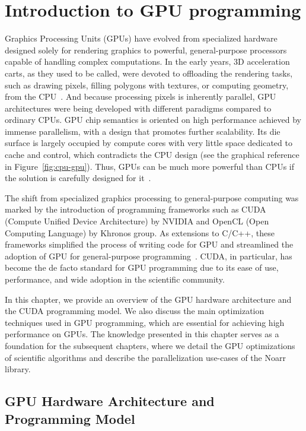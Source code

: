 \chapter{Introduction to GPU programming}
\label{chap:gpu_intro}


Graphics Processing Units (GPUs) have evolved from specialized hardware designed solely for rendering graphics to powerful, general-purpose processors capable of handling complex computations. In the early years, 3D acceleration carts, as they used to be called, were devoted to offloading the rendering tasks, such as drawing pixels, filling polygons with textures, or computing geometry, from the CPU~\cite{pratx2011gpu}. And because processing pixels is inherently parallel, GPU architectures were being developed with different paradigms compared to ordinary CPUs. GPU chip semantics is oriented on high performance achieved by immense parallelism, with a design that promotes further scalability. Its die surface is largely occupied by compute cores with very little space dedicated to cache and control, which contradicts the CPU design (see the graphical reference in Figure~\ref{fig:cpu-gpu}). Thus, GPUs can be much more powerful than CPUs if the solution is carefully designed for it~\cite{navarro2014survey}.

The shift from specialized graphics processing to general-purpose computing was marked by the introduction of programming frameworks such as CUDA (Compute Unified Device Architecture) by NVIDIA and OpenCL (Open Computing Language) by Khronos group. As extensions to C/C++, these frameworks simplified the process of writing code for GPU and streamlined the adoption of GPU for general-purpose programming~\cite{croix2009introduction}. CUDA, in particular, has become the de facto standard for GPU programming due to its ease of use, performance, and wide adoption in the scientific community.

In this chapter, we provide an overview of the GPU hardware architecture and the CUDA programming model. We also discuss the main optimization techniques used in GPU programming, which are essential for achieving high performance on GPUs. The knowledge presented in this chapter serves as a foundation for the subsequent chapters, where we detail the GPU optimizations of scientific algorithms and describe the parallelization use-cases of the Noarr library.

\section{GPU Hardware Architecture and Programming Model}
\label{sec:gpu_arch}

